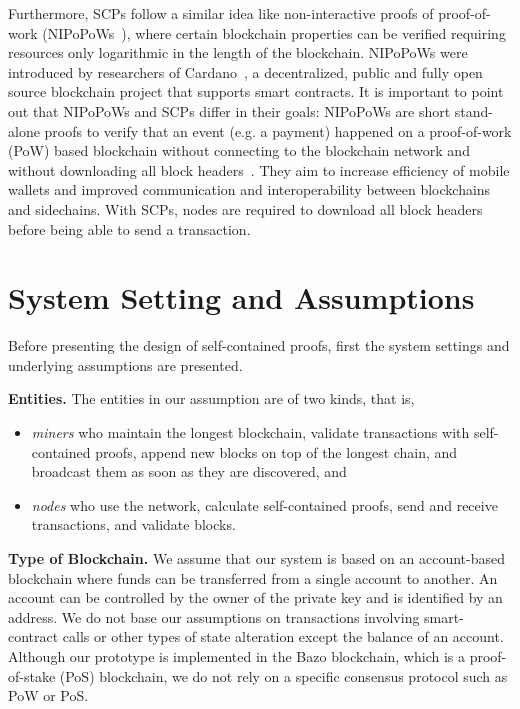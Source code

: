 \documentclass[conference]{IEEEtran}
\begin{document}
Furthermore, SCPs follow a similar idea like non-interactive proofs of proof-of-work (NIPoPoWs~\cite{Kiayias17}), where certain blockchain properties can be verified requiring resources only logarithmic in the length of the blockchain. NIPoPoWs were introduced by researchers of Cardano~\cite{Cardano}, a decentralized, public and fully open source blockchain project that supports smart contracts. It is important to point out that NIPoPoWs and SCPs differ in their goals: NIPoPoWs are short stand-alone proofs to verify that an event (e.g. a payment) happened on a proof-of-work (PoW) based blockchain without connecting to the blockchain network and without downloading all block headers~\cite{NIPoPoWs}. They aim to increase efficiency of mobile wallets and improved communication and interoperability between blockchains and sidechains. With SCPs, nodes are required to download all block headers before being able to send a transaction.

\section{System Setting and Assumptions}
Before presenting the design of self-contained proofs, first the system settings and underlying assumptions are presented.

\textbf{Entities.} The entities in our assumption are of two kinds, that is,
\begin{itemize}
	\item \textit{miners} who maintain the longest blockchain, validate transactions with self-contained proofs, append new blocks on top of the longest chain, and broadcast them as soon as they are discovered, and
	\item \textit{nodes} who use the network, calculate self-contained proofs, send and receive transactions, and validate blocks.
\end{itemize}

\textbf{Type of Blockchain.} We assume that our system is based on an account-based blockchain where funds can be transferred from a single account to another. An account can be controlled by the owner of the private key and is identified by an address. We do not base our assumptions on transactions involving smart-contract calls or other types of state alteration except the balance of an account. Although our prototype is implemented in the Bazo blockchain, which is a proof-of-stake (PoS) blockchain, we do not rely on a specific consensus protocol such as PoW or PoS.
\end{document}
